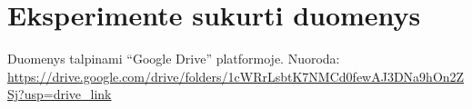 \documentclass{VUMIFInfKursinis}
\begin{document}



\section{Eksperimente sukurti duomenys}
Duomenys talpinami \enquote{Google Drive} platformoje. Nuoroda: \url{https://drive.google.com/drive/folders/1cWRrLsbtK7NMCd0fewAJ3DNa9hOn2ZSj?usp=drive_link}

\appendix 
\end{document}
